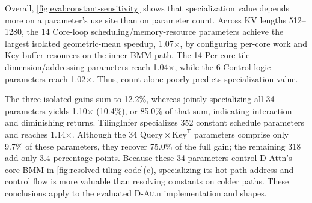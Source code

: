 {\color{blue}%
Overall, \autoref{fig:eval:constant-sensitivity} shows that specialization value depends more on a parameter's use site than on parameter count. Across KV lengths 512--1280, the 14 Core-loop scheduling/memory-resource parameters achieve the largest isolated geometric-mean speedup, 1.07$\times$, by configuring per-core work and Key-buffer resources on the inner BMM path. The 14 Per-core tile dimension/addressing parameters reach 1.04$\times$, while the 6 Control-logic parameters reach 1.02$\times$. Thus, count alone poorly predicts specialization value.
\par}

{\color{blue}%
The three isolated gains sum to 12.2\%, whereas jointly specializing all 34 parameters yields 1.10$\times$ (10.4\%), or 85.0\% of that sum, indicating interaction and diminishing returns. TilingInfer specializes 352 constant schedule parameters and reaches 1.14$\times$. Although the 34 $\mathrm{Query}\times\mathrm{Key}^{\mathsf T}$ parameters comprise only 9.7\% of these parameters, they recover 75.0\% of the full gain; the remaining 318 add only 3.4 percentage points. Because these 34 parameters control D-Attn's core BMM in \autoref{fig:resolved-tiling-code}(c), specializing its hot-path address and control flow is more valuable than resolving constants on colder paths. These conclusions apply to the evaluated D-Attn implementation and shapes.
\par}
